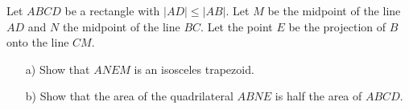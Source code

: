 Let $ABCD$ be a rectangle with $|AD| \leq |AB|$. Let $M$ be the midpoint of the line $AD$ and
$N$ the midpoint of the line $BC$. Let the point $E$ be the projection of $B$ onto the line $CM$.
\begin{enumerate}
    \item[a)] Show that $ANEM$ is an isosceles trapezoid.
    \item[b)] Show that the area of the quadrilateral $ABNE$ is half the area of $ABCD$.
\end{enumerate}
